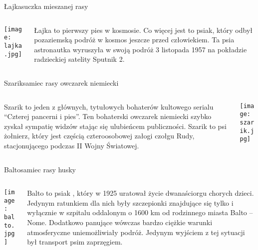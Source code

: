 \documentclass{beamer}
\begin{document}
	\begin{frame}{Łajka}{suczka mieszanej rasy}
		\begin{columns}
			\begin{column}{0.5\textwidth}
				\texttt{[image: lajka.jpg]}
			\end{column}
			\begin{column}{0.5\textwidth}
				Łajka to pierwszy pies w kosmosie. Co więcej jest to psiak, który odbył pozaziemską podróż w kosmos jeszcze przed człowiekiem. Ta psia astronautka wyruszyła w swoją podróż 3 listopada 1957 na pokładzie radzieckiej satelity Sputnik 2.
			\end{column}
		\end{columns}
	\end{frame}
	\begin{frame}{Szarik}{samiec rasy owczarek niemiecki}
		\begin{columns}
			\begin{column}{0.5\textwidth}
				Szarik to jeden z głównych, tytułowych bohaterów kultowego serialu “Czterej pancerni i pies”. Ten bohaterski owczarek niemiecki szybko zyskał sympatię widzów stając się ulubieńcem publiczności. Szarik to psi żołnierz, który jest częścią czteroosobowej załogi czołgu Rudy, stacjonującego podczas II Wojny Światowej.
			\end{column}
			\begin{column}{0.5\textwidth}
				\texttt{[image: szarik.jpg]}
			\end{column}
		\end{columns}
	\end{frame}
	\begin{frame}{Balto}{samiec rasy husky}
		\begin{columns}
			\begin{column}{0.5\textwidth}
				\texttt{[image: balto.jpg]}
			\end{column}
			\begin{column}{0.5\textwidth}
				Balto to psiak , który w 1925 uratował życie dwanaściorgu chorych dzieci.  Jedynym ratunkiem dla nich były szczepionki znajdujące się tylko i wyłącznie w szpitalu oddalonym o 1600 km od rodzinnego miasta Balto – Nome. Dodatkowo panujące wówczas bardzo ciężkie warunki atmosferyczne uniemożliwiały podróż. Jedynym wyjściem z tej sytuacji był transport psim zaprzęgiem.
			\end{column}
		\end{columns}
	\end{frame}
\end{document}
